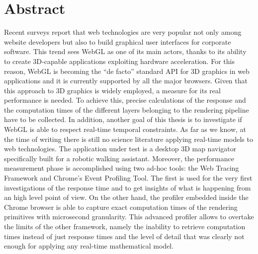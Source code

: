 \chapter*{Abstract} \label{abstract} %

Recent surveys report that web technologies are very popular not only among
website developers but also to build graphical user interfaces for corporate software.
This trend sees WebGL as one of its main actors, thanks to its ability to create
3D-capable applications exploiting hardware acceleration. For this reason, WebGL
is becoming the ``de facto'' standard API for 3D graphics in web applications and
it is currently supported by all the major browsers.
%
Given that this approach to 3D graphics is widely employed, a measure for its
real performance is needed. To achieve this, precise calculations of the response
and the computation times of the different layers belonging to the rendering
pipeline have to be collected.
In addition, another goal of this thesis is to investigate if WebGL is able to
respect real-time temporal constraints. As far as we know, at the time of writing
there is still no science literature applying real-time models to web technologies.
%
The application under test is a desktop 3D map navigator specifically built for
a robotic walking assistant. Moreover, the performance measurement phase is
accomplished using two ad-hoc tools: the Web Tracing Framework and Chrome's
Event Profiling Tool. The first is used for the very first investigations of the
response time and to get insights of what is happening from an high level point
of view. On the other hand, the profiler embedded inside the Chrome browser is
able to capture exact computation times of the rendering primitives with
microsecond granularity. This advanced profiler allows to overtake the limits
of the other framework, namely the inability to retrieve computation times
instead of just response times and the level of detail that was clearly not
enough for applying any real-time mathematical model.

